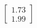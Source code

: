 \documentclass[preview]{standalone}
\begin{document}
\begin{align*}
\begin{bmatrix} 1.73 \\ 1.99 \end{bmatrix}
\end{align*}
\end{document}

